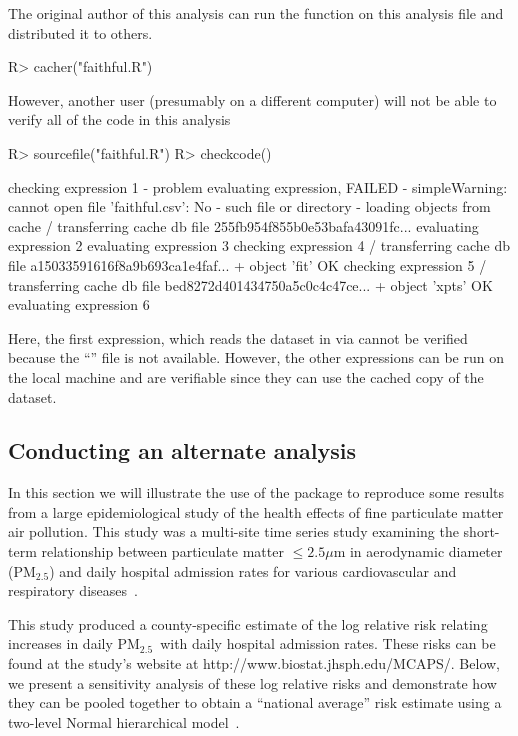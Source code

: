\documentclass[nojss]{jss}
\newcommand{\PMTwoFive}{PM$_{2.5}$}
\begin{document}
The original author of this analysis can run the 
function on this analysis file and distributed it to others.
\begin{Schunk}
\begin{Sinput}
R> cacher("faithful.R")
\end{Sinput}
\end{Schunk}
However, another user (presumably on a different computer) will not be
able to verify all of the code in this analysis
\begin{Schunk}
\begin{Sinput}
R> sourcefile("faithful.R")
R> checkcode()
\end{Sinput}
\begin{Soutput}
checking expression 1
- problem evaluating expression, FAILED
- simpleWarning: cannot open file 'faithful.csv': No
- such file or directory
- loading objects from cache
/ transferring cache db file 255fb954f855b0e53bafa43091fc...
evaluating expression 2
evaluating expression 3
checking expression 4
/ transferring cache db file a15033591616f8a9b693ca1e4faf...
+ object 'fit' OK
checking expression 5
/ transferring cache db file bed8272d401434750a5c0c4c47ce...
+ object 'xpts' OK
evaluating expression 6
\end{Soutput}
\end{Schunk}
Here, the first expression, which reads the dataset in via
 cannot be verified because the ``'' file
is not available.  However, the other expressions can be run on the
local machine and are verifiable since they can use the cached copy of
the dataset.

\subsection{Conducting an alternate analysis}
\label{sec:exampleusage2}


In this section we will illustrate the use of the  package
to reproduce some results from a large epidemiological study of the
health effects of fine particulate matter air pollution.  This study
was a multi-site time series study examining the short-term
relationship between particulate matter $\leq 2.5 \mu$m in aerodynamic
diameter (\PMTwoFive) and daily hospital admission rates for various
cardiovascular and respiratory diseases~\citep{mcaps:2006}.

This study produced a county-specific estimate of the log relative
risk relating increases in daily \PMTwoFive\ with daily hospital
admission rates.  These risks can be found at the study's website at
http://www.biostat.jhsph.edu/MCAPS/.  Below, we present a sensitivity
analysis of these log relative risks and demonstrate how they can be
pooled together to obtain a ``national average'' risk estimate using a
two-level Normal hierarchical model~\citep[more details
in][]{domi:same:zege:2000}.
\end{document}
